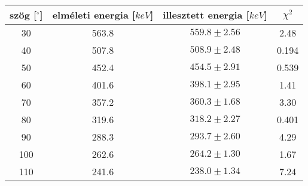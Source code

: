 \begin{tabular}{|c| c| c| c|}\hline

szög [$^{\circ}$] & elméleti energia [$keV$]& illesztett energia [$keV$]& $\chi^2$ \\ \hline
30 &563.8 &$559.8\pm2.56$&2.48 \\\hline
40 &507.8 &$508.9\pm2.48$&0.194 \\\hline
50 &452.4 &$454.5\pm2.91$&0.539\\\hline
60&401.6 &$398.1\pm2.95$&1.41\\\hline
70&357.2 &$360.3\pm1.68 $&3.30\\\hline
80& 319.6&$318.2\pm2.27$&0.401\\\hline
90& 288.3&$293.7\pm2.60$ &4.29\\\hline
100&262.6 &$264.2\pm1.30$&1.67\\\hline
110&241.6 &$238.0\pm1.34$&7.24\\\hline


\end{tabular}
